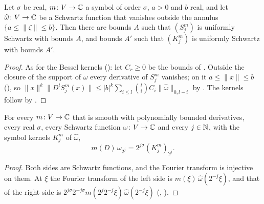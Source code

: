\begin{theorem}
\label{thm:symbol-kernels-uniform}
\leanok
{}
Let $\sigma$ be real, $m \colon V \to \mathbb{C}$ a symbol of order $\sigma$, $a > 0$ and $b$ real, and
let $\widehat\omega \colon V \to \mathbb{C}$ be a Schwartz function that vanishes outside the annulus
$\{a \leq \|\zeta\| \leq b\}$. Then there are bounds $A$ such that $(S^m_j)$ is uniformly
Schwartz with bounds $A$, and bounds $A'$ such that $(K^m_j)$ is uniformly Schwartz with
bounds $A'$.
\end{theorem}

\begin{proof}
\leanok
As for the Bessel kernels (): let $C_r \geq 0$ be the bounds of
. Outside the closure of the support of $\widehat\omega$ every
derivative of $S^m_j$ vanishes; on it $a \leq \|x\| \leq b$ (), so
$\|x\|^k \|D^l S^m_j(x)\| \leq |b|^k \sum_{i \leq l} \binom{l}{i} C_i
\|\widehat\omega\|_{0,l-i}$ by . The kernels follow by
.
\end{proof}

\begin{theorem}
\label{thm:symbol-dilate}
\leanok
{}
For every $m \colon V \to \mathbb{C}$ that is smooth with polynomially bounded derivatives, every real
$\sigma$, every Schwartz function $\omega \colon V \to \mathbb{C}$ and every $j \in \mathbb{N}$, with the symbol
kernels $K^m_j$ of $\widehat\omega$,
\[
  m(D) \, \omega_{2^j} = 2^{j\sigma} (K^m_j)_{2^j} .
\]
\end{theorem}

\begin{proof}
\leanok
Both sides are Schwartz functions, and the Fourier transform is injective on them. At $\xi$ the
Fourier transform of the left side is $m(\xi) \, \widehat\omega(2^{-j} \xi)$, and that of the
right side is $2^{j\sigma} 2^{-j\sigma} m(2^j 2^{-j} \xi) \, \widehat\omega(2^{-j} \xi)$
(, ).
\end{proof}

